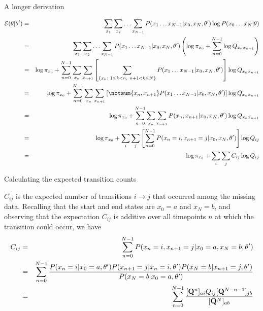 \documentclass{beamer}
\begin{document}
\begin{frame}{A longer derivation}

\tiny
\begin{eqnarray*}
{\cal E}(\theta|\theta')
& = & \sum_{x_1} \sum_{x_2} \ldots \sum_{x_{N-1}} P(x_1 \ldots x_{N-1} | x_0, x_N, \theta') \log P(x_0 \ldots x_N | \theta) \\
& = & \sum_{x_1} \sum_{x_2} \ldots \sum_{x_{N-1}} P(x_1 \ldots x_{N-1} | x_0, x_N, \theta') \left( \log \pi_{x_0} + \sum_{n=0}^{N-1} \log Q_{x_n x_{n+1}} \right) \\
& = & \log \pi_{x_0} + \sum_{n=0}^{N-1} \sum_{x_n} \sum_{x_{n+1}}
\left[ \sum_{\{x_k:\ 1 \leq k < n,\ n+1 < k \leq N\}} P(x_1 \ldots x_{N-1} | x_0, x_N, \theta') \right]
\log Q_{x_n x_{n+1}} \\
& = & \log \pi_{x_0} + \sum_{n=0}^{N-1} \sum_{x_n} \sum_{x_{n+1}}
\left[ \notsum{x_n,x_{n+1}} P(x_1 \ldots x_{N-1} | x_0, x_N, \theta') \right]
\log Q_{x_n x_{n+1}} \\
& = & \log \pi_{x_0} +\sum_{n=0}^{N-1} \sum_{x_n} \sum_{x_{n+1}} P(x_n,x_{n+1}|x_0,x_N,\theta') \log Q_{x_n x_{n+1}} \\
& = & \log \pi_{x_0} + \sum_i \sum_j \left[ \sum_{n=0}^{N-1} P(x_n=i,x_{n+1}=j|x_0,x_N,\theta') \right] \log Q_{ij} \\
& = & \log \pi_{x_0} + \sum_i \sum_j C_{ij} \log Q_{ij}
\end{eqnarray*}
\end{frame}

\begin{frame}{Calculating the expected transition counts}

$C_{ij}$ is the expected number of transitions $i \to j$ that occurred among the missing data.
Recalling that the start and end states are $x_0=a$ and $x_N=b$,
and observing that the expectation $C_{ij}$ is additive over all timepoints $n$ at which the transition could occur,
we have
\small
\begin{eqnarray*}
C_{ij} & = & \sum_{n=0}^{N-1} P(x_n=i,x_{n+1}=j|x_0=a,x_N=b,\theta') \\
& = & \sum_{n=0}^{N-1} \frac{P(x_n=i|x_0=a,\theta') P(x_{n+1}=j|x_n=i,\theta') P(x_N=b|x_{n+1}=j,\theta')}{P(x_N=b|x_0=a,\theta')} \\
& = & \sum_{n=0}^{N-1} \frac{[{\bf Q}^n]_{ai} Q_{ij} [{\bf Q}^{N-n-1}]_{jb}}{[{\bf Q}^N]_{ab}}
\end{eqnarray*}
\end{frame}
\end{document}
